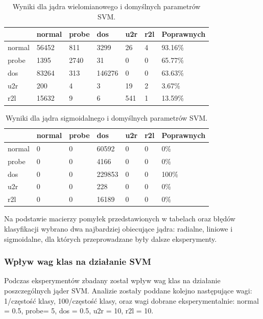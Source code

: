 \documentclass[a4paper, 12pt]{article}
\begin{document}
\begin{table}[H]
\centering
\label{table:cm_svm_poly_default}
\begin{tabular}{ | l | l | l | l | l | l | l | } \hline
	& normal &  probe &   dos  &  u2r  & r2l 	& Poprawnych	\\ \hline
  normal & 56452 &  811 &  3299 & 26 &  4 & 93.16\% \\ \hline
  probe  &  1395 & 2740 &    31 &  0 &  0 & 65.77\% \\ \hline
  dos    & 83264 &  313 & 146276 &  0 &  0 & 63.63\% \\ \hline
  u2r    &   200 &   4  &  3  & 19  & 2 & 3.67\% \\ \hline
  r2l    & 15632 &    9 &  6  & 541 &  1 & 13.59\% \\ \hline
\end{tabular} 
\caption{Wyniki dla jądra wielomianowego i domyślnych parametrów SVM.}
\end{table}

\begin{table}[H]
\centering
\label{table:cm_svm_sigmoid_default}
\begin{tabular}{ | l | l | l | l | l | l | l | } \hline
	& normal &  probe &   dos  &  u2r  & r2l 	& Poprawnych	\\ \hline
  normal   &   0  &   0 & 60592  &  0  &  0 & 0\% \\ \hline
  probe    &   0  &   0 &  4166  &  0  &  0 & 0\% \\ \hline
  dos      &   0  &   0 & 229853 &  0  &  0 & 100\% \\ \hline
  u2r      &   0  &   0 &   228  &  0  &  0 & 0\% \\ \hline
  r2l      &   0  &   0 & 16189  &  0  &  0 & 0\% \\ \hline
\end{tabular} 
\caption{Wyniki dla jądra sigmoidalnego i domyślnych parametrów SVM.}
\end{table}

Na podstawie macierzy pomyłek przedstawionych w tabelach oraz błędów klasyfikacji wybrano dwa najbardziej obiecujące jądra: radialne, liniowe i sigmoidalne, dla których przeprowadzane były dalsze eksperymenty.

\subsubsection{Wpływ wag klas na działanie SVM}
Podczas eksperymentów zbadany został wpływ wag klas na działanie poszczególnych jąder SVM. Analizie zostały poddane kolejno następujące wagi: 1/częstość klasy, 100/częstość klasy, oraz wagi dobrane eksperymentalnie: normal = 0.5, probe= 5, dos = 0.5, u2r = 10, r2l = 10.
\end{document}
